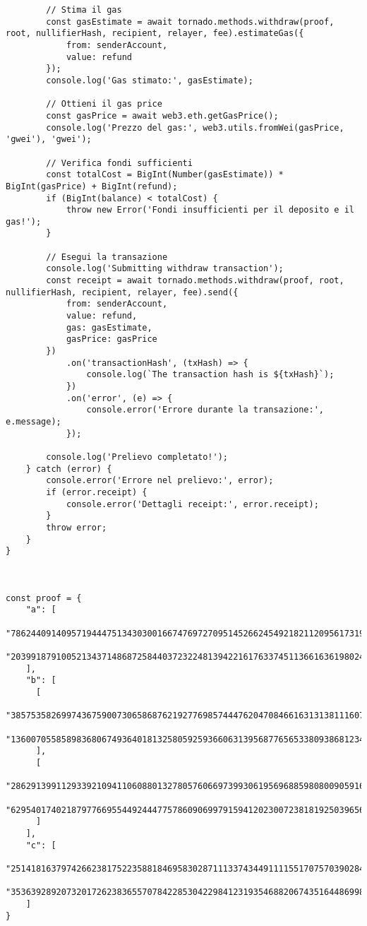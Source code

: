 \begin{lstlisting}
        // Stima il gas
        const gasEstimate = await tornado.methods.withdraw(proof, root, nullifierHash, recipient, relayer, fee).estimateGas({
            from: senderAccount,
            value: refund
        });
        console.log('Gas stimato:', gasEstimate);

        // Ottieni il gas price
        const gasPrice = await web3.eth.getGasPrice();
        console.log('Prezzo del gas:', web3.utils.fromWei(gasPrice, 'gwei'), 'gwei');

        // Verifica fondi sufficienti
        const totalCost = BigInt(Number(gasEstimate)) * BigInt(gasPrice) + BigInt(refund);
        if (BigInt(balance) < totalCost) {
            throw new Error('Fondi insufficienti per il deposito e il gas!');
        }

        // Esegui la transazione
        console.log('Submitting withdraw transaction');
        const receipt = await tornado.methods.withdraw(proof, root, nullifierHash, recipient, relayer, fee).send({
            from: senderAccount,
            value: refund,
            gas: gasEstimate,
            gasPrice: gasPrice
        })
            .on('transactionHash', (txHash) => {
                console.log(`The transaction hash is ${txHash}`);
            })
            .on('error', (e) => {
                console.error('Errore durante la transazione:', e.message);
            });

        console.log('Prelievo completato!');
    } catch (error) {
        console.error('Errore nel prelievo:', error);
        if (error.receipt) {
            console.error('Dettagli receipt:', error.receipt);
        }
        throw error;
    }
}



const proof = {
    "a": [
      "7862440914095719444751343030016674769727095145266245492182112095617319191350",
      "20399187910052134371486872584403723224813942216176337451136616361980246752812"
    ],
    "b": [
      [
        "385753582699743675900730658687621927769857444762047084661631313811160781351",
        "13600705585898368067493640181325805925936606313956877656533809386812346179126"
      ],
      [
        "2862913991129339210941106088013278057606697399306195696885980800905916213309",
        "6295401740218797766955449244477578609069979159412023007238181925039656728935"
      ]
    ],
    "c": [
      "2514181637974266238175223588184695830287111337434491111551707570390284323099",
      "3536392892073201726238365570784228530422984123193546882067435164486998942928"
    ]
}


\end{lstlisting}
